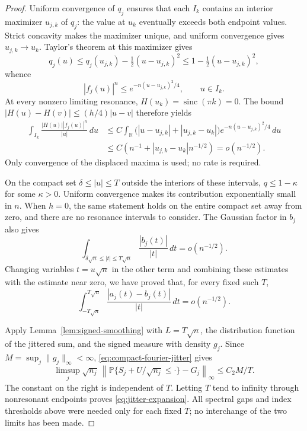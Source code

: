 \documentclass[aop]{imsart}
\theoremstyle{plain}
\theoremstyle{definition}
\theoremstyle{definition}
\newcommand{\PP}{\mathbb P}
\newcommand{\R}{\mathbb R}
\DeclareMathOperator{\sinc}{sinc}
\begin{document}
\begin{proof}
Uniform convergence of \(q_j\) ensures that each \(I_k\) contains an
interior maximizer \(u_{j,k}\) of \(q_j\): the value at \(u_k\)
eventually exceeds both endpoint values.  Strict concavity makes the
maximizer unique, and uniform convergence gives \(u_{j,k}\to u_k\).
Taylor's theorem at this maximizer gives
\[
 q_j(u)\le q_j(u_{j,k})-\tfrac12(u-u_{j,k})^2
        \le1-\tfrac12(u-u_{j,k})^2,
\]
whence
\[
 |f_j(u)|^n\le e^{-n(u-u_{j,k})^2/4},\qquad u\in I_k.
\]
At every nonzero limiting resonance, \(H(u_k)=\sinc(\pi k)=0\).
The bound \(|H(u)-H(v)|\le(h/4)|u-v|\) therefore yields
\[
 \begin{split}
 \int_{I_k}\frac{|H(u)||f_j(u)|^n}{|u|}\,du
 &\le C\int_{\R}
       \bigl(|u-u_{j,k}|+|u_{j,k}-u_k|\bigr)
       e^{-n(u-u_{j,k})^2/4}\,du\\
 &\le C\left(n^{-1}+|u_{j,k}-u_k|n^{-1/2}\right)
   =o(n^{-1/2}).
 \end{split}
\]
Only convergence of the displaced maxima is used; no rate is required.

On the compact set \(\delta\le|u|\le T\) outside the interiors of
these intervals, \(q\le1-\kappa\) for some \(\kappa>0\).
Uniform convergence makes its contribution exponentially small in \(n\).
When \(h=0\), the same statement holds on the entire compact set away
from zero, and there are no resonance intervals to consider.  The
Gaussian factor in \(b_j\) also gives
\[
 \int_{\delta\sqrt n\le|t|\le T\sqrt n}
      \frac{|b_j(t)|}{|t|}\,dt=o(n^{-1/2}).
\]
Changing variables \(t=u\sqrt n\) in the other term and combining
these estimates with the estimate near zero, we have proved that, for
every fixed such \(T\),
\begin{equation}\label{eq:compact-fourier-jitter}
 \int_{-T\sqrt n}^{T\sqrt n}
       \frac{|a_j(t)-b_j(t)|}{|t|}\,dt=o(n^{-1/2}).
\end{equation}

Apply Lemma~\ref{lem:signed-smoothing} with \(L=T\sqrt n\), the
distribution function of the jittered sum, and the signed measure with
density \(g_j\).  Since \(M=\sup_j\|g_j\|_\infty<\infty\),
\eqref{eq:compact-fourier-jitter} gives
\[
 \limsup_j\sqrt{n_j}\,
 \left\|\PP\{S_j+U/\sqrt{n_j}\le\cdot\}-G_j\right\|_\infty
 \le C_2M/T.
\]
The constant on the right is independent of \(T\).  Letting \(T\)
tend to infinity through nonresonant endpoints proves
\eqref{eq:jitter-expansion}.  All spectral gaps and index thresholds
above were needed only for each fixed \(T\); no interchange of the
two limits has been made.
\end{proof}
\end{document}

